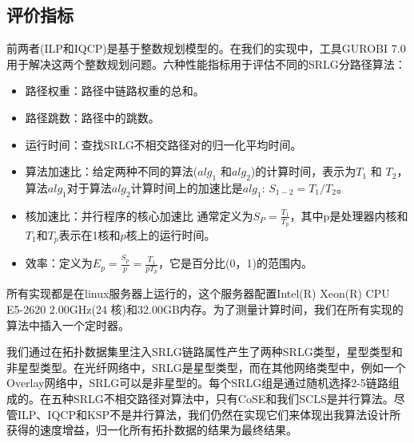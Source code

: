 \subsection{评价指标}
前两者(ILP和IQCP)是基于整数规划模型的。在我们的实现中，工具GUROBI 7.0\cite{optimization2012gurobi}用于解决这两个整数规划问题。六种性能指标用于评估不同的SRLG分路径算法：
\begin{itemize}
  \item 路径权重：路径中链路权重的总和。
  \item 路径跳数：路径中的跳数。
  \item 运行时间：查找SRLG不相交路径对的归一化平均时间。
  \item 算法加速比：给定两种不同的算法($alg_1$ 和$alg_2$)的计算时间，表示为$T_1$ 和 $T_2$，算法$alg_1$对于算法$alg_2$计算时间上的加速比是$alg_1$: ${S_{1 - 2}} = T_1/T_2$。
  \item 核加速比：并行程序的核心加速比\cite{grama2003introduction} 通常定义为$S_P=\frac{T_1}{T_p}$，其中p是处理器内核和$T_1$和$T_p$表示在1核和$p$核上的运行时间。
  \item 效率\cite{grama2003introduction}：定义为$E_p=\frac{S_p}{p}=\frac{T_1}{pT_p}$，它是百分比(0，1)的范围内。


\end{itemize}


所有实现都是在linux服务器上运行的，这个服务器配置Intel(R) Xeon(R) CPU E5-2620  2.00GHz(24 核)和32.00GB内存。为了测量计算时间，我们在所有实现的算法中插入一个定时器。

我们通过在拓扑数据集里注入SRLG链路属性产生了两种SRLG类型，星型类型和非星型类型。在光纤网络中，SRLG是星型类型，而在其他网络类型中，例如一个Overlay网络中，SRLG可以是非星型的。每个SRLG组是通过随机选择2-5链路组成的。在五种SRLG不相交路径对算法中，只有CoSE和我们SCLS是并行算法。尽管ILP、IQCP和KSP不是并行算法，我们仍然在实现它们来体现出我算法设计所获得的速度增益，归一化\cite{tax2000feature}所有拓扑数据的结果为最终结果。


